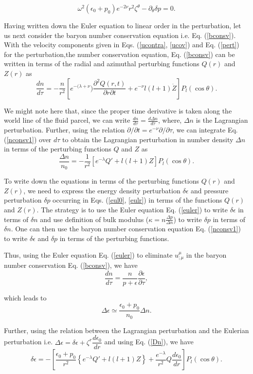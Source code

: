 \documentclass[a4paper, 11pt]{article}
\def\be{\begin{equation}}
\def\ee{\end{equation}}
\begin{document}
\be
\omega^2(\epsilon_0 + p_0)e^{-2\nu}r^2{\zeta^\theta}-\partial_\theta \delta p=0. \label{eulth}
\ee

Having written down the Euler equation to linear order in the perturbation, let us next consider the baryon number conservation equation i.e. Eq. (\ref{bconsv}). With the velocity components given in Eqs. (\ref{ucontra}, \ref{ucov}) and Eq. (\ref{pert}) for the perturbation,the number conservation equation, Eq. (\ref{bconsv}) can be written in terms of the radial and azimuthal perturbing functions $Q(r)$ and $Z(r)$ as
\be
\frac{dn}{d\tau}=-\frac{n}{r^2}\left[e^{-(\lambda+\nu}) \frac{\partial^2 Q(r,t)}{\partial r\partial t }+e^{-\nu}l(l+1)\dot Z\right]P_l(\cos\theta). \label{nconsv1}
\ee

We might note here that, since the proper time derivative is taken along the world line of the fluid parcel, we can write $\frac{dn}{d\tau}=\frac{d\Delta n}{d\tau}$, where, $\Delta n$ is the Lagrangian perturbation. Further, using the relation $\partial/\partial t=e^{-\nu}\partial/\partial\tau$, we can integrate Eq. (\ref{nconsv1}) over $d\tau$ to obtain the Lagrangian perturbation in number density $\Delta n$ in terms of the perturbing functions $Q$ and $Z$ as
\be
\frac{\Delta n}{n_0}=-\frac{1}{r^2}\left[e^{-\lambda} Q'+l(l+1)Z\right]P_l(\cos\theta). \label{Dn}
\ee

To write down the equations in terms of the perturbing functions $Q(r)$ and $Z(r)$, we need to express the energy density perturbation $\delta \epsilon$ and pressure perturbation $\delta p$ occurring in Eqs. (\ref{eul0}, \ref{eulr}) in terms of the functions $Q(r)$ and $Z(r)$. The strategy is to use the Euler equation Eq. (\ref{euler}) to write $\delta\epsilon$ in terms of $\delta n$ and use definition of bulk modulus ($\kappa=n\frac{\Delta p}{\Delta n}$) to write $\delta p$ in terms of $\delta n$. One can then use the baryon number conservation equation Eq. (\ref{nconsv1}) to write $\delta \epsilon$ and $\delta p$ in terms of the perturbing functions.

Thus, using the Euler equation Eq. (\ref{euler}) to eliminate $u^\mu_{;\mu}$ in the baryon number conservation Eq. (\ref{bconsv}), we have
\be
\frac{dn}{d\tau}=\frac{n}{p+\epsilon}\frac{\partial \epsilon}{\partial \tau},
\ee

\noindent which leads to
\be
\Delta\epsilon\simeq\frac{\epsilon_0+p_0}{n_0}\Delta n.
\ee

Further, using the relation between the Lagrangian perturbation and the Eulerian perturbation i.e. $\Delta\epsilon=\delta\epsilon+\zeta^r\dfrac{d\epsilon_0}{dr}$ and using Eq. (\ref{Dn}), we have 
\be
\delta\epsilon = -\left[\frac{\epsilon_0+p_0}{r^2}\left\lbrace e^{-\lambda} Q'+l(l+1)Z \right\rbrace + \frac{e^{-\lambda}}{r^2} Q\frac{d\epsilon_0}{dr}\right]P_l(\cos\theta). \label{drho}
\ee
\end{document}
